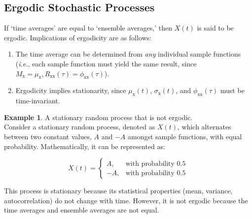 \documentclass[12pt]{book}
\theoremstyle{definition}
\newtheorem{exmp}{Example}[chapter]
\begin{document}
\subsection{Ergodic Stochastic Processes}

If `time averages' are equal to `ensemble averages,' then $X(t)$ is said to be ergodic. Implications of ergodicity are as follows:

\begin{enumerate}
    \item The time average can be determined from \emph{any} individual sample functions (\emph{i.e.}, each sample function must yield the same result, since \( M_\mathrm{x}=\mu_\mathrm{x}, R_\mathrm{xx}(\tau) = \phi_\mathrm{xx}(\tau)\)).
    \item Ergodicity implies stationarity, since $\mu_\mathrm{x}(t)$, $\sigma_\mathrm{x}(t)$, and $\phi_\mathrm{xx}(\tau)$ must be time-invariant.

\end{enumerate}

\begin{tcolorbox}
    
\begin{exmp}{A stationary random process that is not ergodic.}\\

    Consider a stationary random process, denoted as \(X(t)\), which alternates between two constant values, \(A\) and \(-A\) amongst sample functions, with equal probability. Mathematically, it can be represented as:

\[
X(t) = \begin{cases} 
A, & \text{with probability } 0.5 \\
-A, & \text{with probability } 0.5 
\end{cases}
\]
\end{exmp}
\end{tcolorbox}

This process is stationary because its statistical properties (mean, variance, autocorrelation) do not change with time. However, it is not ergodic because the time averages and ensemble averages are not equal.\\
\end{document}

